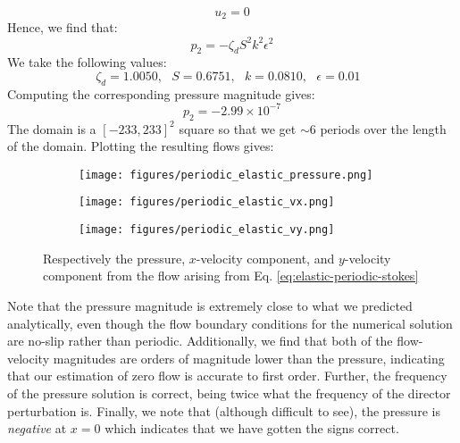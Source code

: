 \documentclass[reqno]{article}
\begin{document}
\begin{equation}
  u_2 = 0
\end{equation}
Hence, we find that:
\begin{equation}
  p_2 = - \zeta_d S^2 k^2 \epsilon^2
\end{equation}
We take the following values:
\begin{equation}
  \zeta_d = 1.0050, \:\:\:
  S = 0.6751, \:\:\:
  k = 0.0810, \:\:\:
  \epsilon = 0.01 \:\:\:
\end{equation}
Computing the corresponding pressure magnitude gives:
\begin{equation}
  p_2 = -2.99 \times 10^{-7}
\end{equation}
The domain is a $[-233, 233]^2$ square so that we get $\sim 6$ periods over the
length of the domain.
Plotting the resulting flows gives:
\begin{figure}[H] 
  \centering
  \begin{subfigure}{0.45\textwidth}
    \texttt{[image: figures/periodic\_elastic\_pressure.png]}
    \caption{}
    \label{fig:periodic-elastic-pressure}
  \end{subfigure}
  \hfill
  \begin{subfigure}{0.45\textwidth}
    \texttt{[image: figures/periodic\_elastic\_vx.png]}
    \caption{}
    \label{fig:periodic-elastic-vx}
  \end{subfigure}
  \begin{subfigure}{0.45\textwidth}
    \texttt{[image: figures/periodic\_elastic\_vy.png]}
    \caption{}
    \label{fig:periodic-elastic-vy}
  \end{subfigure}
  \caption{Respectively the pressure, $x$-velocity component, and $y$-velocity
    component from the flow arising from Eq. \eqref{eq:elastic-periodic-stokes}}
  \label{fig:periodic-elastic-plot}
\end{figure}
Note that the pressure magnitude is extremely close to what we predicted
analytically, even though the flow boundary conditions for the numerical
solution are no-slip rather than periodic.
Additionally, we find that both of the flow-velocity magnitudes are orders of
magnitude lower than the pressure, indicating that our estimation of zero flow
is accurate to first order.
Further, the frequency of the pressure solution is correct, being twice what the
frequency of the director perturbation is.
Finally, we note that (although difficult to see), the pressure is
\textit{negative} at $x = 0$ which indicates that we have gotten the signs correct.
\end{document}
